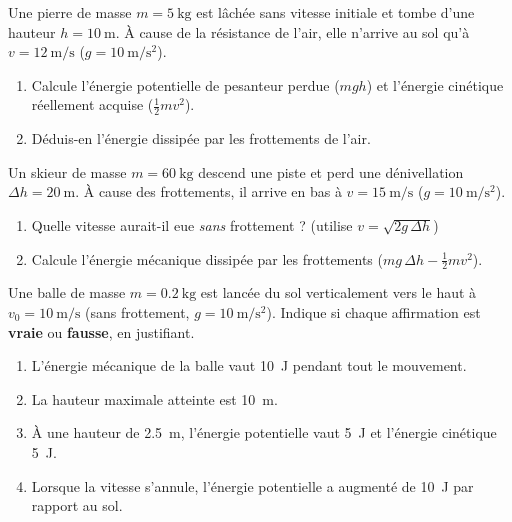 \documentclass[11pt,a4paper]{article}
\begin{document}

\begin{exo}
Une pierre de masse $m=\qty{5}{\kilogram}$ est lâchée sans vitesse initiale et tombe d'une hauteur
$h=\qty{10}{\metre}$. À cause de la résistance de l'air, elle n'arrive au sol qu'à
$v=\qty{12}{\metre\per\second}$ ($g=\qty{10}{\metre\per\second\squared}$).
\begin{enumerate}[label=\alph*)]
  \item Calcule l'énergie potentielle de pesanteur perdue ($mgh$) et l'énergie cinétique réellement
        acquise ($\tfrac12 m v^2$).
  \item Déduis-en l'énergie dissipée par les frottements de l'air.
\end{enumerate}
\end{exo}

\begin{exo}
Un skieur de masse $m=\qty{60}{\kilogram}$ descend une piste et perd une dénivellation
$\Delta h=\qty{20}{\metre}$. À cause des frottements, il arrive en bas à $v=\qty{15}{\metre\per\second}$
($g=\qty{10}{\metre\per\second\squared}$).
\begin{enumerate}[label=\alph*)]
  \item Quelle vitesse aurait-il eue \emph{sans} frottement ? (utilise $v=\sqrt{2g\,\Delta h}$)
  \item Calcule l'énergie mécanique dissipée par les frottements ($mg\,\Delta h-\tfrac12 m v^2$).
\end{enumerate}
\end{exo}

\begin{exo}
Une balle de masse $m=\qty{0,2}{\kilogram}$ est lancée du sol verticalement vers le haut à
$v_0=\qty{10}{\metre\per\second}$ (sans frottement, $g=\qty{10}{\metre\per\second\squared}$). Indique si
chaque affirmation est \textbf{vraie} ou \textbf{fausse}, en justifiant.
\begin{enumerate}[label=\alph*)]
  \item L'énergie mécanique de la balle vaut \qty{10}{\joule} pendant tout le mouvement.
  \item La hauteur maximale atteinte est \qty{10}{\metre}.
  \item À une hauteur de \qty{2,5}{\metre}, l'énergie potentielle vaut \qty{5}{\joule} et l'énergie
        cinétique \qty{5}{\joule}.
  \item Lorsque la vitesse s'annule, l'énergie potentielle a augmenté de \qty{10}{\joule} par rapport
        au sol.
\end{enumerate}
\end{exo}
\end{document}
